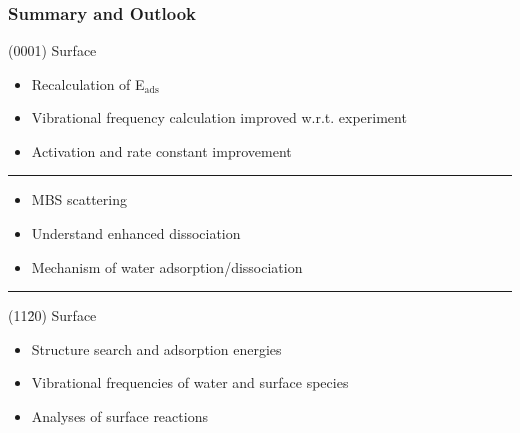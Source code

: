 \documentclass[hyperref={pdfpagelabels=false}]{beamer}
\begin{document}
\begin{frame}
\begin{columns}
\begin{center}
 \end{center}
 \end{columns}
 \newline~\newline~\newline
{}
\end{frame}


\section*{}
\begin{frame}
 \frametitle{Summary and Outlook}
 {\color{blue}(0001) Surface}
\begin{itemize}
 \item Recalculation of E$_{\textrm{ads}}$ 
 \item Vibrational frequency calculation improved w.r.t. experiment
 \item Activation and rate constant improvement
\end{itemize}
 \pause\hrule
\begin{itemize}
 \item MBS scattering
 \item Understand enhanced dissociation
 \item Mechanism of water adsorption/dissociation
\end{itemize}
 \pause\hrule
 {\color{blue}(11\=20) Surface}
\begin{itemize}
 \item Structure search and adsorption energies
 \item Vibrational frequencies of water and surface species
 \item Analyses of surface reactions
\end{itemize}
 \end{frame}
\end{document}
